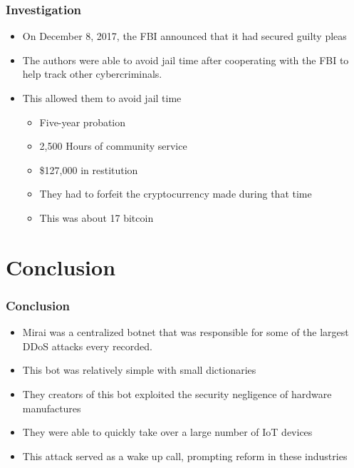 \documentclass{beamer}
\begin{document}
\begin{frame}
	\frametitle{Investigation}
	\begin{itemize}
		\item<+-> On December 8, 2017, the FBI announced that it had secured guilty pleas
		\item<+-> The authors were able to avoid jail time after cooperating with the FBI to help track other cybercriminals.
		\item<+-> This allowed them to avoid jail time
		\begin{itemize}
			\item<+-> Five-year probation
			\item<+-> 2,500 Hours of community service
			\item<+-> \$127,000 in restitution
			\item<+-> They had to forfeit the cryptocurrency made during that time
			\item<+-> This was about 17 bitcoin
		\end{itemize}
	\end{itemize}
\end{frame}

\section{Conclusion}

\begin{frame}
	\frametitle{Conclusion}
	\begin{itemize}
		\item<+-> Mirai was a centralized botnet that was responsible for some of the largest DDoS attacks every recorded.
		\item<+-> This bot was relatively simple with small dictionaries
		\item<+-> They creators of this bot exploited the security negligence of hardware manufactures
		\item<+-> They were able to quickly take over a large number of IoT devices
		\item<+-> This attack served as a wake up call, prompting reform in these industries
	\end{itemize}
\end{frame}
\end{document}
